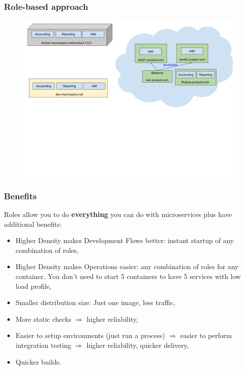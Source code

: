 \documentclass[usenames,dvipsnames]{beamer}
\begin{document}
\begin{frame}
\frametitle{Role-based approach}
\begin{figure}
    \includegraphics[width=\textwidth]{media/role-based-layout.png}
\end{figure}
\end{frame}

\begin{frame}
\frametitle{Benefits}
Roles allow you to do \textbf{everything} you can do with microservices plus have additional benefits\footnotemark[1]:
\begin{itemize}
\item Higher Density makes Development Flows better: instant startup of any combination of roles,
\item Higher Density makes Operations easier: any combination of roles for any container. 
    You don't need to start 5 containers to have 5 services with low load profile,
\item Smaller distribution size: Just one image, less traffic,
\item More static checks $\Rightarrow$ higher reliability,
\item Easier to setup environments (just run a process) $\Rightarrow$ easier to perform integration testing $\Rightarrow$ higher reliability, quicker delivery,
\item Quicker builds.
\end{itemize}
\end{frame}
\end{document}
